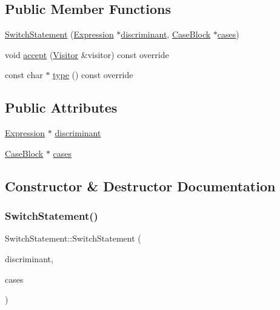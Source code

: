 \subsection*{Public Member Functions}
\begin{DoxyCompactItemize}
\item 
\hyperlink{struct_switch_statement_adab42f2a56bc686f522587ff6f39b70a}{Switch\+Statement} (\hyperlink{struct_expression}{Expression} $\ast$\hyperlink{struct_switch_statement_a6b04149d29751485e93c698298ebbe5d}{discriminant}, \hyperlink{struct_case_block}{Case\+Block} $\ast$\hyperlink{struct_switch_statement_a2e2f296ddcb9fcb69bd4daeac8c850b0}{cases})
\item 
void \hyperlink{struct_switch_statement_a948b1d975437e623ad183d5599ce51f9}{accept} (\hyperlink{struct_visitor}{Visitor} \&visitor) const override
\item 
const char $\ast$ \hyperlink{struct_switch_statement_a58f7924f68adeef7f73b0403715182c1}{type} () const override
\end{DoxyCompactItemize}
\subsection*{Public Attributes}
\begin{DoxyCompactItemize}
\item 
\hyperlink{struct_expression}{Expression} $\ast$ \hyperlink{struct_switch_statement_a6b04149d29751485e93c698298ebbe5d}{discriminant}
\item 
\hyperlink{struct_case_block}{Case\+Block} $\ast$ \hyperlink{struct_switch_statement_a2e2f296ddcb9fcb69bd4daeac8c850b0}{cases}
\end{DoxyCompactItemize}


\subsection{Constructor \& Destructor Documentation}
\mbox{\label{struct_switch_statement_adab42f2a56bc686f522587ff6f39b70a}} 
\subsubsection{\texorpdfstring{Switch\+Statement()}{SwitchStatement()}}
{\footnotesize\ttfamily Switch\+Statement\+::\+Switch\+Statement (\begin{DoxyParamCaption}\item[{\hyperlink{struct_expression}{Expression} $\ast$}]{discriminant,  }\item[{\hyperlink{struct_case_block}{Case\+Block} $\ast$}]{cases }\end{DoxyParamCaption})\hspace{0.3cm}{\ttfamily [inline]}}



